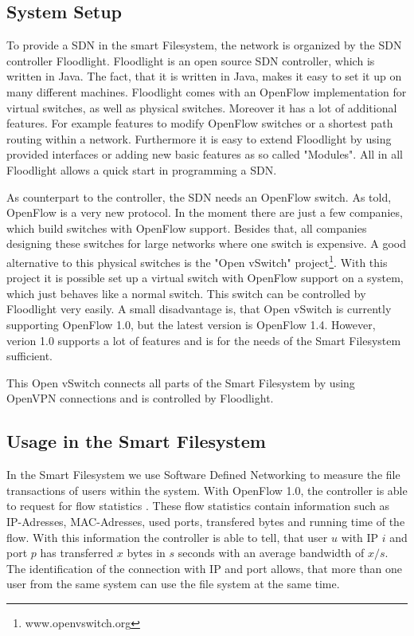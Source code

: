 \subsection{System Setup}
To provide a SDN in the smart Filesystem, the network is organized by the SDN controller Floodlight\cite{flood}. Floodlight is an open source SDN controller, which is written in Java. The fact, that it is written in Java, makes it easy to set it up on many different machines. Floodlight comes with an OpenFlow implementation for virtual switches, as well as physical switches. Moreover it has a lot of additional features. For example features to modify OpenFlow switches or a shortest path routing within a network. Furthermore it is easy to extend Floodlight by using provided interfaces or adding new basic features as so called "Modules". All in all Floodlight allows a quick start in programming a SDN.

As counterpart to the controller, the SDN needs an OpenFlow switch. As told, OpenFlow is a very new protocol. In the moment there are just a few companies, which build switches with OpenFlow support. Besides that, all companies designing these switches for large networks where one switch is expensive. A good alternative to this physical switches is the "Open vSwitch" project\footnote{www.openvswitch.org}. With this project it is possible set up a virtual switch with OpenFlow support on a system, which just behaves like a normal switch. This switch can be controlled by Floodlight very easily. A small disadvantage is, that Open vSwitch is currently supporting OpenFlow 1.0\cite{ovs}, but the latest version is OpenFlow 1.4\cite{ofspec4}. However, verion 1.0 supports a lot of features and is for the needs of the Smart Filesystem sufficient.

This Open vSwitch connects all parts of the Smart Filesystem by using OpenVPN connections and is controlled by Floodlight.     
   
\subsection{Usage in the Smart Filesystem}\label{usage}
In the Smart Filesystem we use Software Defined Networking to measure the file transactions of users within the system. With OpenFlow 1.0, the controller is able to request for flow statistics \cite[P. 31]{ofspec}. These flow statistics contain information such as IP-Adresses, MAC-Adresses, used ports, transfered bytes and running time of the flow. With this information the controller is able to tell, that user $u$ with IP $i$ and port $p$ has transferred $x$ bytes in $s$ seconds with an average bandwidth of $x/s$. The identification of the connection with IP and port allows, that more than one user from the same system can use the file system at the same time.


